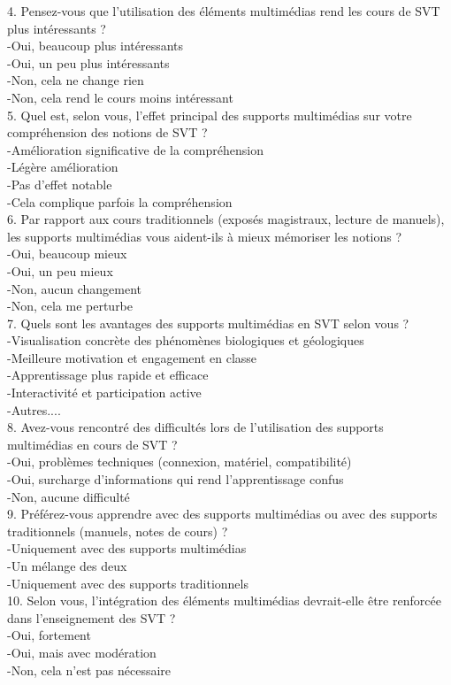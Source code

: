 \documentclass[a4paper,oneside,12pt]{book}
\begin{document}
4. Pensez-vous que l’utilisation des éléments multimédias rend les cours de SVT plus intéressants ?\\
-Oui, beaucoup plus intéressants\\
-Oui, un peu plus intéressants\\
-Non, cela ne change rien\\
-Non, cela rend le cours moins intéressant\\

5. Quel est, selon vous, l’effet principal des supports multimédias sur votre compréhension des notions de SVT ?\\
-Amélioration significative de la compréhension\\
-Légère amélioration\\
-Pas d’effet notable\\
-Cela complique parfois la compréhension\\

6. Par rapport aux cours traditionnels (exposés magistraux, lecture de manuels), les supports multimédias vous aident-ils à mieux mémoriser les notions ?\\
-Oui, beaucoup mieux\\
-Oui, un peu mieux\\
-Non, aucun changement\\
-Non, cela me perturbe\\

7. Quels sont les avantages des supports multimédias en SVT selon vous ? \\
-Visualisation concrète des phénomènes biologiques et géologiques\\
-Meilleure motivation et engagement en classe\\
-Apprentissage plus rapide et efficace\\
-Interactivité et participation active\\
-Autres....\\

8. Avez-vous rencontré des difficultés lors de l’utilisation des supports multimédias en cours de SVT ?\\
-Oui, problèmes techniques (connexion, matériel, compatibilité)\\
-Oui, surcharge d’informations qui rend l’apprentissage confus\\
-Non, aucune difficulté\\


9. Préférez-vous apprendre avec des supports multimédias ou avec des supports traditionnels (manuels, notes de cours) ?\\
-Uniquement avec des supports multimédias\\
-Un mélange des deux\\
-Uniquement avec des supports traditionnels\\

10. Selon vous, l'intégration des éléments multimédias devrait-elle être renforcée dans l'enseignement des SVT ?\\
-Oui, fortement\\
-Oui, mais avec modération\\
-Non, cela n’est pas nécessaire







 
\end{document}
